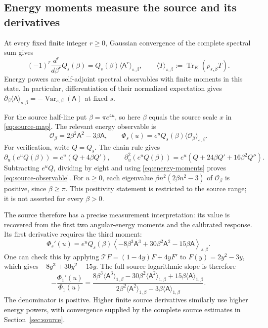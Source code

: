 \documentclass[11pt,letterpaper]{article}
\numberwithin{equation}{section}
\theoremstyle{remark}
\DeclareMathOperator{\Tr}{Tr}
\begin{document}
\subsection{Energy moments measure the source and its derivatives}

At every fixed finite integer \(r\ge0\), Gaussian convergence of
the complete spectral sum gives
\begin{equation}
 (-1)^r\frac{d^r}{d\beta^r}Q_s(\beta)
 =Q_s(\beta)\langle\mathsf A^r\rangle_{s,\beta},\qquad
 \langle T\rangle_{s,\beta}:=\Tr_K(\rho_{s,\beta}T).
 \label{eq:energy-moments}
\end{equation}
Energy powers are self-adjoint spectral observables with finite moments
in this state. In particular, differentiation of their normalized
expectation gives
\(\partial_\beta\langle\mathsf A\rangle_{s,\beta}
=-\operatorname{Var}_{s,\beta}(\mathsf A)\) at fixed \(s\).

For the source half-line put \(\beta=\pi e^{4u}\), so here \(\beta\)
equals the source scale \(x\) in \eqref{eq:source-map}. The relevant
energy observable is
\begin{equation}
 \mathcal O_\beta=2\beta^2\mathsf A^2-3\beta\mathsf A,\qquad
 \boxed{\Phi_s(u)=e^uQ_s(\beta)
                 \langle\mathcal O_\beta\rangle_{s,\beta}.}
 \label{eq:source-observable}
\end{equation}
For verification, write \(Q=Q_s\). The chain rule gives
\[
 \partial_u(e^uQ(\beta))=e^u(Q+4\beta Q'),\qquad
 \partial_u^2(e^uQ(\beta))
 =e^u(Q+24\beta Q'+16\beta^2Q'').
\]
Subtracting \(e^uQ\), dividing by eight and using
\eqref{eq:energy-moments} proves \eqref{eq:source-observable}.
For \(u\ge0\), each eigenvalue
\(\beta n^2(2\beta n^2-3)\) of \(\mathcal O_\beta\) is positive,
since \(\beta\ge\pi\). This positivity statement is restricted to
the source range; it is not asserted for every \(\beta>0\).

The source therefore has a precise measurement interpretation: its
value is recovered from the first two angular-energy moments and the
calibrated response. Its first derivative requires the third moment:
\begin{equation}
 \Phi_s'(u)=e^uQ_s(\beta)
 \left\langle-8\beta^3\mathsf A^3
                +30\beta^2\mathsf A^2-15\beta\mathsf A\right\rangle_{s,\beta}.
 \label{eq:source-slope-observable}
\end{equation}
One can check this by applying
\(\mathcal T F=(1-4y)F+4yF'\) to \(F(y)=2y^2-3y\), which
gives \(-8y^3+30y^2-15y\). The full-source logarithmic slope is
therefore
\begin{equation}
 -\frac{\Phi_1'(u)}{\Phi_1(u)}
 =\frac{8\beta^3\langle\mathsf A^3\rangle_{1,\beta}
          -30\beta^2\langle\mathsf A^2\rangle_{1,\beta}
          +15\beta\langle\mathsf A\rangle_{1,\beta}}
        {2\beta^2\langle\mathsf A^2\rangle_{1,\beta}
          -3\beta\langle\mathsf A\rangle_{1,\beta}}.
 \label{eq:source-score-observable}
\end{equation}
The denominator is positive. Higher finite source derivatives similarly
use higher energy powers, with convergence supplied by the complete
source estimates in Section~\ref{sec:source}.
\end{document}
